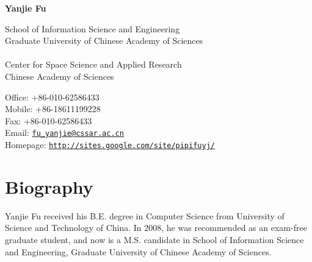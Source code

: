 \documentclass[10pt,letterpaper]{article}
\def\name{Yanjie Fu}
\begin{document}
{\huge \bf \name}


\vspace{0.25in}

\begin{minipage}[t]{0.55\textwidth}
  School of Information Science and Engineering\\
  Graduate University of Chinese Academy of Sciences\\
  \\
  Center for Space Science and Applied Research\\
  Chinese Academy of Sciences\\
\end{minipage}
\begin{minipage}[t]{0.45\textwidth}
  Office: +86-010-62586433\\
  Mobile: +86-18611199228\\
  Fax: +86-010-62586433\\
  Email: \href{mailto:fu_yanjie@cssar.ac.cn}{\texttt{fu\_yanjie@cssar.ac.cn}}\\
  Homepage: \href{http://sites.google.com/site/pipifuyj/}{\texttt{http://sites.google.com/site/pipifuyj/}} \\
\end{minipage}

\section*{Biography}
Yanjie Fu received his B.E. degree in Computer Science from University of Science and Technology of China. In 2008, he was recommended as an exam-free graduate student, and now is a M.S. candidate in School of Information Science and Engineering, Graduate University of Chinese Academy of Sciences.
\end{document}
